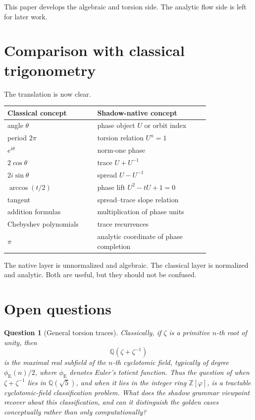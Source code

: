 \documentclass[11pt]{article}
\newtheorem{question}[definition]{Question}
\newcommand{\ph}{\varphi}
\newcommand{\Z}{\mathbb{Z}}
\newcommand{\Q}{\mathbb{Q}}
\begin{document}
This paper develops the algebraic and torsion side.  The analytic flow side is left for later work.

\section{Comparison with classical trigonometry}

The translation is now clear.

\begin{center}
\begin{tabular}{p{0.36\linewidth}p{0.45\linewidth}}
\toprule
Classical concept & Shadow-native concept \\
\midrule
angle $\theta$ & phase object $U$ or orbit index \\
period $2\pi$ & torsion relation $U^n=1$ \\
$e^{i\theta}$ & norm-one phase \\
$2\cos\theta$ & trace $U+U^{-1}$ \\
$2i\sin\theta$ & spread $U-U^{-1}$ \\
$\arccos(t/2)$ & phase lift $U^2-tU+1=0$ \\
tangent & spread--trace slope relation \\
addition formulas & multiplication of phase units \\
Chebyshev polynomials & trace recurrences \\
$\pi$ & analytic coordinate of phase completion \\
\bottomrule
\end{tabular}
\end{center}

The native layer is unnormalized and algebraic.  The classical layer is normalized and analytic.  Both are useful, but they should not be confused.

\section{Open questions}

\begin{question}[General torsion traces]
Classically, if $\zeta$ is a primitive $n$-th root of unity, then
\[
    \Q(\zeta+\zeta^{-1})
\]
is the maximal real subfield of the $n$-th cyclotomic field, typically of degree $\phi_{\mathrm E}(n)/2$, where $\phi_{\mathrm E}$ denotes Euler's totient function.  Thus the question of when $\zeta+\zeta^{-1}$ lies in $\Q(\sqrt5)$, and when it lies in the integer ring $\Z[\ph]$, is a tractable cyclotomic-field classification problem.  What does the shadow grammar viewpoint recover about this classification, and can it distinguish the golden cases conceptually rather than only computationally?
\end{question}
\end{document}
